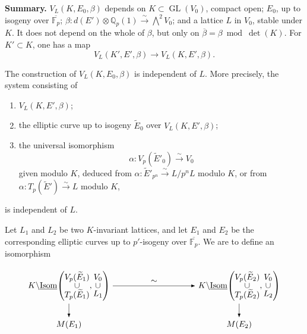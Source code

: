 \documentclass[11pt]{article}
\newcommand{\Fp}{\mathbb{F}_{p}}
\newcommand{\Qp}{\mathbb{Q}_{p}}
\newcommand{\GL}{\operatorname{GL}}
\newcommand{\wt}{\widetilde}
\begin{document}
\textbf{Summary.} \(V_L(K,E_0,\beta)\) depends on \(K\subset\GL(V_0)\), compact open; \(E_0\), up to isogeny over \(\overline{\Fp}\); \(\beta:d(E')\otimes\Qp(1)\xrightarrow{\sim}\bigwedge^2V_0\); and a lattice \(L\) in \(V_0\), stable under \(K\). It does not depend on the whole of \(\beta\), but only on \(\overline{\beta}=\beta\bmod\det(K)\). For \(K'\subset K\), one has a map
\[
V_L(K',E',\beta)\longrightarrow V_L(K,E',\beta).
\]

The construction of \(V_L(K,E_0,\beta)\) is independent of \(L\). More precisely, the system consisting of
\begin{enumerate}[label=(\alph*)]
\item \(V_L(K,E',\beta)\);
\item the elliptic curve up to isogeny \(\wt E_0\) over \(V_L(K,E',\beta)\);
\item the universal isomorphism
\[
\alpha:V_p(\wt E'_0)\xrightarrow{\sim}V_0
\]
given modulo \(K\), deduced from \(\alpha:\wt E'_{p^n}\xrightarrow{\sim}L/p^nL\) modulo \(K\), or from \(\alpha:T_p(\wt E')\xrightarrow{\sim}L\) modulo \(K\),
\end{enumerate}
is independent of \(L\).

Let \(L_1\) and \(L_2\) be two \(K\)-invariant lattices, and let \(E_1\) and \(E_2\) be the corresponding elliptic curves up to \(p'\)-isogeny over \(\overline{\Fp}\). We are to define an isomorphism

\[
\begin{tikzpicture}[x=1cm,y=1cm,>=Latex,baseline=(current bounding box.center)]
  \node (A) at (0,1.2) {$K\backslash\underline{\operatorname{Isom}}\!\left(\begin{matrix}V_p(\widetilde E_1)\\[-2pt]\cup\\[-2pt]T_p(\widetilde E_1)\end{matrix},\begin{matrix}V_0\\[-2pt]\cup\\[-2pt]L_1\end{matrix}\right)$};
  \node (B) at (7.2,1.2) {$K\backslash\underline{\operatorname{Isom}}\!\left(\begin{matrix}V_p(\widetilde E_2)\\[-2pt]\cup\\[-2pt]T_p(\widetilde E_2)\end{matrix},\begin{matrix}V_0\\[-2pt]\cup\\[-2pt]L_2\end{matrix}\right)$};
  \node (M1) at (0,-0.45) {$M(E_1)$};
  \node (M2) at (7.2,-0.45) {$M(E_2)$};
  \draw[->] (A) -- node[above] {$\sim$} (B);
  \draw[->] (A) -- (M1);
  \draw[->] (B) -- (M2);
\end{tikzpicture}
\]
\end{document}
